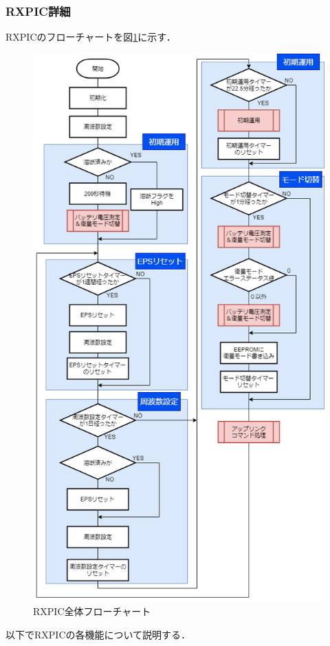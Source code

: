 \subsubsection{RXPIC詳細}\label{subsubsec:RXPIC詳細}
RXPICのフローチャートを図\ref{fig:3-4-2-1}に示す．
\begin{figure}[H]
	\centering
	\includegraphics[scale=0.6]{03/fig/3-4-2-1.png}
	\caption{RXPIC全体フローチャート}
	\label{fig:3-4-2-1}
\end{figure}
以下でRXPICの各機能について説明する．
